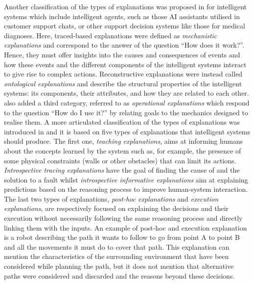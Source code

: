 \documentclass[final,1p,times]{elsarticle}
\begin{document}
Another classification of the types of explanations was proposed in \cite{haynes2009designs} for intelligent systems which include intelligent agents, such as those AI assistants utilised in customer support chats, or other support decision systems like those for medical diagnoses.
Here, traced-based explanations were defined as \textit{mechanistic explanations} and correspond to the answer of the question ``How does it work?''. Hence, they must offer insights into the causes and consequences of events and how these events and the different components of the intelligent systems interact to give rise to complex actions. Reconstructive explanations were instead called \textit{ontological explanations} and describe the structural properties of the intelligent systems: its components, their attributes, and how they are related to each other. \cite{haynes2009designs} also added a third category, referred to as \textit{operational explanations} which respond to the question ``How do I use it?'' by relating goals to the mechanics designed to realise them. 
A more articulated classification of the types of explanations was introduced in \cite{sheh2017introspectively} and it is based on five types of explanations that intelligent systems should produce. The first one, \textit{teaching explanations}, aims at informing humans about the concepts learned by the system such as, for example, the presence of some physical constraints (walls or other obstacles) that can limit its actions. \textit{Introspective tracing explanations} have the goal of finding the cause of and the solution to a fault whilst \textit{introspective informative explanations} aim at explaining predictions based on the reasoning process to improve human-system interaction. The last two types of explanations, \textit{post-hoc explanations} and \textit{execution explanations}, are respectively focused on explaining the decisions and their execution without necessarily following the same reasoning process and directly linking them with the inputs. An example of post-hoc and execution explanation is a robot describing the path it wants to follow to go from point A to point B and all the movements it must do to cover that path. This explanation can mention the characteristics of the surrounding environment that have been considered while planning the path, but it does not mention that alternative paths were considered and discarded and the reasons beyond these decisions.
\end{document}
